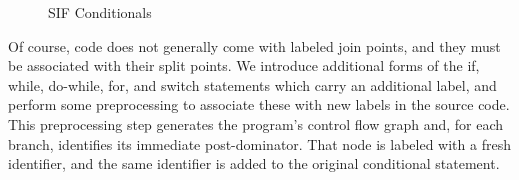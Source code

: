 \documentclass{llncs}
\begin{document}
{\begin{figure}
  \begin{minipage}{0.55\textwidth}
  \end{minipage}
  \begin{minipage}{0.35\textwidth}

  \end{minipage}
  
  \caption{SIF Conditionals}
  \label{fig:SIFconditionals}
\end{figure}

Of course, code does not generally come with labeled join points, and they must be associated
with their split points. We introduce additional forms of the if, while, do-while, for, and switch
statements which carry an additional label, and perform some preprocessing to associate these
with new labels in the source code. This preprocessing step generates the program's
control flow graph and, for each branch, identifies its immediate post-dominator. That
node is labeled with  a fresh identifier, and the same identifier is added to the original
conditional statement.

%
%
%

}
\end{document}

